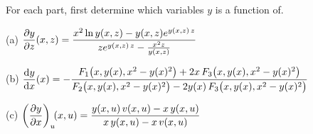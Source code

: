 \begin{hint}
For each part, first determine which variables $y$ is a function
of.
\end{hint}

\begin{answer}
(a) $\displaystyle\pdiff{y}{z}(x,z)
           =\frac{x^2 \ln y(x,z)-y(x,z)e^{y(x,z)\,z}}
                     {ze^{y(x,z)\,z}-\frac{x^2 z}{y(x,z)}}$

(b) $\displaystyle\diff{y}{x}(x)
=-\frac{F_1\big(x,y(x),x^2-y(x)^2\big)+2x\,F_3\big(x,y(x),x^2-y(x)^2\big)}
{F_2\big(x,y(x),x^2-y(x)^2\big)-2y(x)\,F_3\big(x,y(x),x^2-y(x)^2\big)}$

(c) $\displaystyle\left(\pdiff{y}{x}\right)_u\!\!(x,u)
=\frac{y(x,u)\,v(x,u)-x\,y(x,u)}{x\,y(x,u)-x\,v(x,u)}$

\end{answer}

